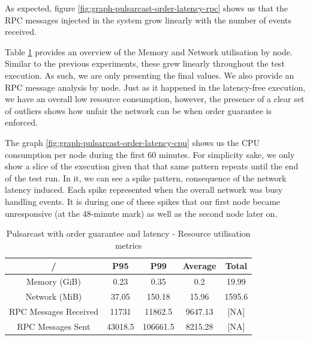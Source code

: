 As expected, figure \ref{fig:graph-pulsarcast-order-latency-rpc} shows us that
the RPC messages injected in the system grow linearly with the number of events
received.

Table \ref{table:pulsarcast-order-latency} provides an overview of the Memory
and Network utilisation by node. Similar to the previous experiments, these
grew linearly throughout the test execution. As such, we are only presenting
the final values. We also provide an RPC message analysis by node. Just as it
happened in the latency-free execution, we have an overall low resource
consumption, however, the presence of a clear set of outliers shows how unfair
the network can be when order guarantee is enforced.

The graph \ref{fig:graph-pulsarcast-order-latency-cpu} shows us the CPU
consumption per node during the first 60 minutes. For simplicity sake, we only
show a slice of the execution given that that same pattern repeats until the
end of the test run. In it, we can see a spike pattern, consequence of the
network latency induced. Each spike represented when the overall network was
busy handling events. It is during one of these spikes that our first node
became unresponsive (at the 48-minute mark) as well as the second node later
on.

\begin{table}[!htb]
\caption{Pulsarcast with order guarantee and latency - Resource utilisation metrics}
\label{table:pulsarcast-order-latency}
  \begin{center}
   \begin{tabular}{|c| c c c c|} 
   \hline
   / & P95 & P99 & Average & Total \\ [0.5ex] 
   \hline\hline
   Memory (GiB) & 0.23 & 0.35 & 0.2 & 19.99 \\
   \hline
   Network (MiB) & 37.05 & 150.18 & 15.96 & 1595.6 \\
   \hline
   RPC Messages Received & 11731 & 11862.5 & 9647.13 & [NA] \\
   \hline
   RPC Messages Sent & 43018.5 & 106661.5 & 8215.28 & [NA] \\ [1ex] 
   \hline
  \end{tabular}
  \end{center}
\end{table}

